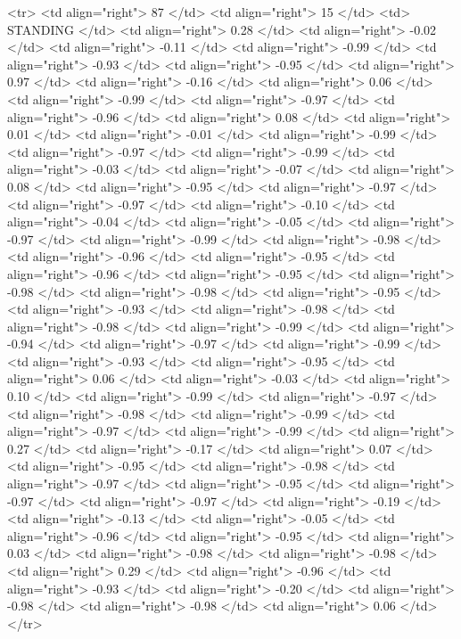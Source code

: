   <tr> <td align="right"> 87 </td> <td align="right">  15 </td> <td> STANDING </td> <td align="right"> 0.28 </td> <td align="right"> -0.02 </td> <td align="right"> -0.11 </td> <td align="right"> -0.99 </td> <td align="right"> -0.93 </td> <td align="right"> -0.95 </td> <td align="right"> 0.97 </td> <td align="right"> -0.16 </td> <td align="right"> 0.06 </td> <td align="right"> -0.99 </td> <td align="right"> -0.97 </td> <td align="right"> -0.96 </td> <td align="right"> 0.08 </td> <td align="right"> 0.01 </td> <td align="right"> -0.01 </td> <td align="right"> -0.99 </td> <td align="right"> -0.97 </td> <td align="right"> -0.99 </td> <td align="right"> -0.03 </td> <td align="right"> -0.07 </td> <td align="right"> 0.08 </td> <td align="right"> -0.95 </td> <td align="right"> -0.97 </td> <td align="right"> -0.97 </td> <td align="right"> -0.10 </td> <td align="right"> -0.04 </td> <td align="right"> -0.05 </td> <td align="right"> -0.97 </td> <td align="right"> -0.99 </td> <td align="right"> -0.98 </td> <td align="right"> -0.96 </td> <td align="right"> -0.95 </td> <td align="right"> -0.96 </td> <td align="right"> -0.95 </td> <td align="right"> -0.98 </td> <td align="right"> -0.98 </td> <td align="right"> -0.95 </td> <td align="right"> -0.93 </td> <td align="right"> -0.98 </td> <td align="right"> -0.98 </td> <td align="right"> -0.99 </td> <td align="right"> -0.94 </td> <td align="right"> -0.97 </td> <td align="right"> -0.99 </td> <td align="right"> -0.93 </td> <td align="right"> -0.95 </td> <td align="right"> 0.06 </td> <td align="right"> -0.03 </td> <td align="right"> 0.10 </td> <td align="right"> -0.99 </td> <td align="right"> -0.97 </td> <td align="right"> -0.98 </td> <td align="right"> -0.99 </td> <td align="right"> -0.97 </td> <td align="right"> -0.99 </td> <td align="right"> 0.27 </td> <td align="right"> -0.17 </td> <td align="right"> 0.07 </td> <td align="right"> -0.95 </td> <td align="right"> -0.98 </td> <td align="right"> -0.97 </td> <td align="right"> -0.95 </td> <td align="right"> -0.97 </td> <td align="right"> -0.97 </td> <td align="right"> -0.19 </td> <td align="right"> -0.13 </td> <td align="right"> -0.05 </td> <td align="right"> -0.96 </td> <td align="right"> -0.95 </td> <td align="right"> 0.03 </td> <td align="right"> -0.98 </td> <td align="right"> -0.98 </td> <td align="right"> 0.29 </td> <td align="right"> -0.96 </td> <td align="right"> -0.93 </td> <td align="right"> -0.20 </td> <td align="right"> -0.98 </td> <td align="right"> -0.98 </td> <td align="right"> 0.06 </td> </tr>
